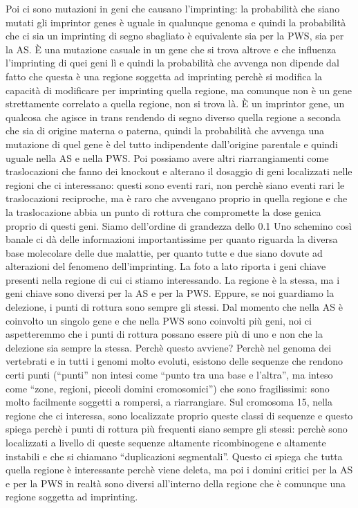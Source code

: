 \documentclass[11pt]{book}
\begin{document}
Poi ci sono mutazioni in geni che causano l’imprinting: la probabilità che siano mutati gli imprintor genes è uguale in qualunque genoma e quindi la probabilità che ci sia un imprinting di segno sbagliato è equivalente sia per la PWS, sia per la AS. È una mutazione casuale in un gene che si trova altrove e che influenza l’imprinting di quei geni lì e quindi la probabilità che avvenga non dipende dal fatto che questa è una regione soggetta ad imprinting perchè si modifica la capacità di modificare per imprinting quella regione, ma comunque non è un gene strettamente correlato a quella regione, non si trova là. 
È un imprintor gene, un qualcosa che agisce in trans rendendo di segno diverso quella regione a seconda che sia di origine materna o paterna, quindi la probabilità che avvenga una mutazione di quel gene è del tutto indipendente dall’origine parentale e quindi uguale nella AS e nella PWS.
Poi possiamo avere altri riarrangiamenti come traslocazioni che fanno dei knockout e alterano il dosaggio di geni localizzati nelle regioni che ci interessano: questi sono eventi rari, non perchè siano eventi rari le traslocazioni reciproche, ma è raro che avvengano proprio in quella regione e che la traslocazione abbia un punto di rottura che compromette la dose genica proprio di questi geni. Siamo dell’ordine di grandezza dello 0.1%
Uno schemino così banale ci dà delle informazioni importantissime per quanto riguarda la diversa base molecolare delle due malattie, per quanto tutte e due siano dovute ad alterazioni del fenomeno dell’imprinting.
La foto a lato riporta i geni chiave presenti nella regione di cui ci stiamo interessando. 
La regione è la stessa, ma i geni chiave sono diversi per la AS e per la PWS. Eppure, se noi guardiamo la delezione, i punti di rottura sono sempre gli stessi. Dal momento che nella AS è coinvolto un singolo gene e che nella PWS sono coinvolti più geni, noi ci aspetteremmo che i punti di rottura possano essere più di uno e non che la delezione sia sempre la stessa. 
Perchè questo avviene?
Perchè nel genoma dei vertebrati e in tutti i genomi molto evoluti, esistono delle sequenze che rendono certi punti (“punti” non intesi come “punto tra una base e l’altra”, ma inteso come “zone, regioni, piccoli domini cromosomici”) che sono fragilissimi: sono molto facilmente soggetti a rompersi, a riarrangiare. 
Sul cromosoma 15, nella regione che ci interessa, sono localizzate proprio queste classi di sequenze e questo spiega perchè i punti di rottura più frequenti siano sempre gli stessi: perchè sono localizzati a livello di queste sequenze altamente ricombinogene e altamente instabili e che si chiamano “duplicazioni segmentali”. Questo ci spiega che tutta quella regione è interessante perchè viene deleta, ma poi i domini critici per la AS e per la PWS in realtà sono diversi all’interno della regione che è comunque una regione soggetta ad imprinting.
\end{document}
